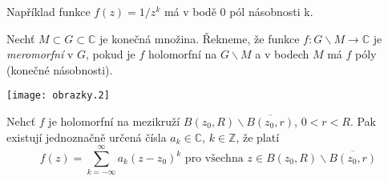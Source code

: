 Například funkce $f(z) = 1 / z^k$ má v bodě 0 pól násobnosti k.

\begin{definice}
Nechť $M \subset G \subset \mathbb{C}$ je konečná množina. Řekneme, že funkce $f : G \backslash M \rightarrow \mathbb{C}$ je \emph{meromorfní} v $G$, pokud je $f$ holomorfní na $G \backslash M$ a v bodech $M$ má $f$ póly (konečné násobnosti).
\end{definice}

\begin{center}
\texttt{[image: obrazky.2]}
\end{center}


\begin{vetat}
Nehcť $f$ je holomorfní na mezikruží $B(z_0, R) \backslash \overline{B(z_0, r)}$, $0 < r < R$. Pak existují jednoznačně určená čísla $a_k \in \mathbb{C}$, $k \in \mathbb{Z}$, že platí 
$$f(z) = \sum_{k= - \infty}^\infty a_k (z-z_0)^k \textrm{ pro všechna } z \in B(z_0, R) \backslash \overline{B(z_0, r)}$$
\end{vetat}


